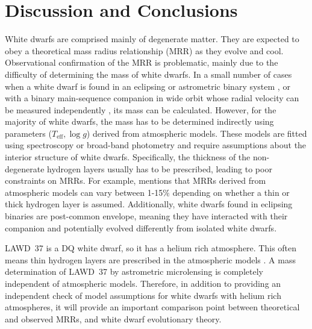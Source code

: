 \documentclass[fleqn,usenatbib]{mnras}
\begin{document}
\section{Discussion and Conclusions}

White dwarfs are comprised mainly of degenerate matter. They are expected to obey a theoretical mass radius relationship (MRR) as they evolve and cool. Observational confirmation of the MRR is problematic, mainly due to the difficulty of determining the mass of white dwarfs. In a small number of cases when a white dwarf is found in an eclipsing or astrometric binary system \citep[see eg.][]{Parsons2016,Liebert2013}, or with a binary main-sequence companion in wide orbit whose radial velocity can be measured independently \citep{2010ApJ...712..585F}, its mass can be calculated. However, for the majority of white dwarfs, the mass has to be determined indirectly using parameters ($T_{\text{eff}},\log g$) derived from atmospheric models. These models are fitted using spectroscopy or broad-band photometry and require assumptions about the interior structure of white dwarfs. Specifically, the thickness of the non-degenerate hydrogen layers usually has to be prescribed, leading to poor constraints on MRRs. For example, \cite{Tremblay2017} mentions that MRRs derived from atmospheric models can vary between 1-15$\%$ depending on whether a thin or thick hydrogen layer is assumed. Additionally, white dwarfs found in eclipsing binaries are post-common envelope, meaning they have interacted with their companion and potentially evolved differently from isolated white dwarfs. 




LAWD~37 is a DQ white dwarf, so it has a helium rich atmosphere. This often means thin hydrogen layers are prescribed in the atmospheric models \citep{Tremblay2017}. A mass determination of LAWD~37 by astrometric microlensing is completely independent of atmospheric models. Therefore, in addition to providing an independent check of model assumptions for white dwarfs with helium rich atmospheres, it will provide an important comparison point between theoretical and observed MRRs, and white dwarf evolutionary theory. 
\end{document}
